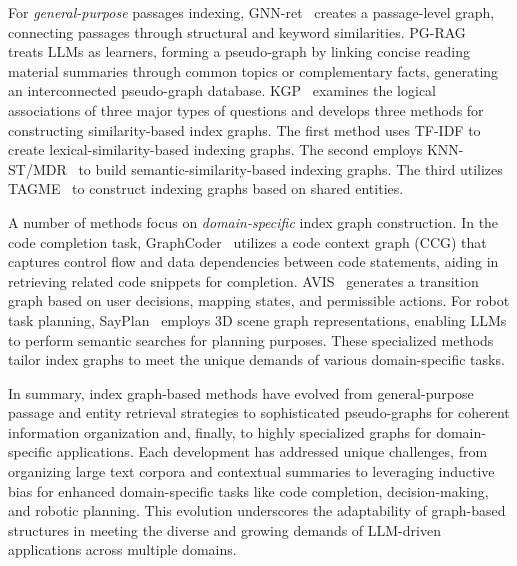 \documentclass[lettersize,journal]{IEEEtran}
\begin{document}
For \textit{general-purpose} passages indexing, GNN-ret~\cite{li2024graph} creates a passage-level graph, connecting passages through structural and keyword similarities.  PG-RAG~\cite{liang2024empowering} treats LLMs as learners, forming a pseudo-graph by linking concise reading material summaries through common topics or complementary facts, generating an interconnected pseudo-graph database. KGP~\cite{wang2024knowledge} examines the logical associations of three major types of questions and develops three methods for constructing similarity-based index graphs. The first method uses TF-IDF to create lexical-similarity-based indexing graphs. The second employs KNN-ST/MDR~\cite{xiong2020mdr} to build semantic-similarity-based indexing graphs. The third utilizes TAGME~\cite{min2019knowledge} to construct indexing graphs based on shared entities.

A number of methods focus on \textit{domain-specific} index graph construction. In the code completion task, GraphCoder~\cite{liu2024graphcoder} utilizes a code context graph (CCG) that captures control flow and data dependencies between code statements, aiding in retrieving related code snippets for completion. AVIS~\cite{hu2024avis} generates a transition graph based on user decisions, mapping states, and permissible actions. For robot task planning, SayPlan~\cite{rana2023sayplan} employs 3D scene graph representations, enabling LLMs to perform semantic searches for planning purposes. These specialized methods tailor index graphs to meet the unique demands of various domain-specific tasks.

In summary, index graph-based methods have evolved from general-purpose passage and entity retrieval strategies to sophisticated pseudo-graphs for coherent information organization and, finally, to highly specialized graphs for domain-specific applications. Each development has addressed unique challenges, from organizing large text corpora and contextual summaries to leveraging inductive bias for enhanced domain-specific tasks like code completion, decision-making, and robotic planning. This evolution underscores the adaptability of graph-based structures in meeting the diverse and growing demands of LLM-driven applications across multiple domains.
\end{document}
